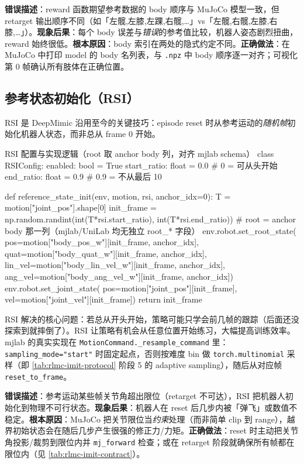 \begin{pitfall}
\textbf{错误描述}：reward 函数期望参考数据的 body 顺序与 MuJoCo 模型一致，但 retarget 输出顺序不同（如「左髋,左膝,左踝,右髋,…」vs「左髋,右髋,左膝,右膝,…」）。\textbf{现象后果}：每个 body 误差与\emph{错误}的参考值比较，机器人姿态剧烈扭曲，reward 始终很低。\textbf{根本原因}：body 索引在两处的隐式约定不同。\textbf{正确做法}：在 MuJoCo 中打印 model 的 body 名列表，与 \texttt{.npz} 中 body 顺序逐一对齐；可视化第 0 帧确认所有肢体在正确位置。
\end{pitfall}

\subsection{参考状态初始化（RSI）}
\label{sec:rlmc-imit-track-rsi}

RSI 是 DeepMimic 沿用至今的关键技巧：episode reset 时从参考运动的\emph{随机帧}初始化机器人状态，而非总从 frame 0 开始。

\begin{codebox}[Python]{RSI 配置与实现逻辑（root 取 anchor body 列，对齐 mjlab schema）}
class RSIConfig:
    enabled: bool = True
    start_ratio: float = 0.0    # 0 = 可从头开始
    end_ratio: float = 0.9      # 0.9 = 不从最后 10%

def reference_state_init(env, motion, rsi, anchor_idx=0):
    T = motion["joint_pos"].shape[0]
    init_frame = np.random.randint(int(T*rsi.start_ratio), int(T*rsi.end_ratio))
    # root = anchor body 那一列（mjlab/UniLab 均无独立 root_* 字段）
    env.robot.set_root_state(
        pos=motion["body_pos_w"][init_frame, anchor_idx],
        quat=motion["body_quat_w"][init_frame, anchor_idx],
        lin_vel=motion["body_lin_vel_w"][init_frame, anchor_idx],
        ang_vel=motion["body_ang_vel_w"][init_frame, anchor_idx])
    env.robot.set_joint_state(
        pos=motion["joint_pos"][init_frame], vel=motion["joint_vel"][init_frame])
    return init_frame
\end{codebox}

RSI 解决的核心问题：若总从开头开始，策略可能只学会前几帧的跟踪（后面还没探索到就摔倒了）。RSI 让策略有机会从任意位置开始练习，大幅提高训练效率。mjlab 的真实实现在 \verb|MotionCommand._resample_command| 里：\verb|sampling_mode="start"| 时固定起点，否则按难度 bin 做 \verb|torch.multinomial| 采样（即 \cref{tab:rlmc-imit-protocol} 阶段 5 的 adaptive sampling），随后从对应帧 \verb|reset_to_frame|。

\begin{pitfall}
\textbf{错误描述}：参考运动某些帧关节角超出限位（retarget 不可达），RSI 把机器人初始化到物理不可行状态。\textbf{现象后果}：机器人在 reset 后几步内被「弹飞」或数值不稳定。\textbf{根本原因}：MuJoCo 把关节限位当\emph{约束}处理（而非简单 clip 到 range），越界初始状态会在随后几步产生很强的修正力/力矩。\textbf{正确做法}：reset 时主动把关节角投影/裁剪到限位内并 \verb|mj_forward| 检查；或在 retarget 阶段就确保所有帧都在限位内（见 \cref{tab:rlmc-imit-contract}）。
\end{pitfall}

